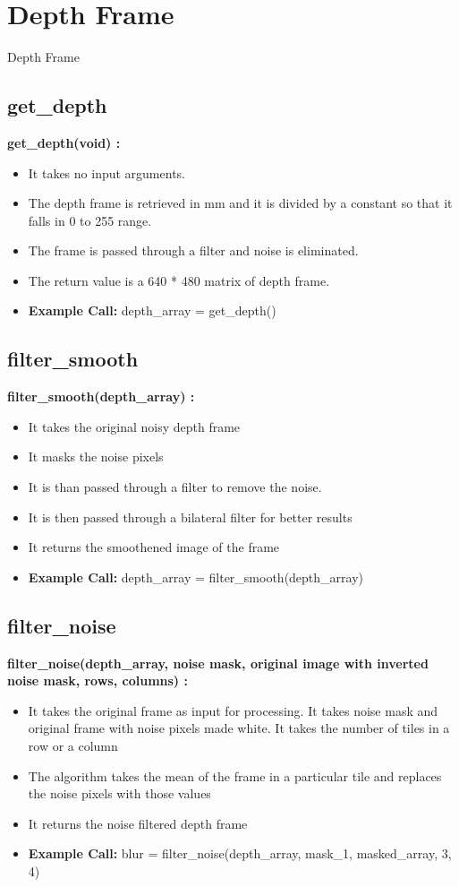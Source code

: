 \documentclass[10pt, a4paper]{beamer}
\begin{document}
\section{Depth Frame}
\begin{frame}[allowframebreaks]{Depth Frame}
  \subsection{get\_depth}
    \textbf{get\_depth(void) : }
    \begin{itemize}
     \item It takes no input arguments.
     \item The depth frame is retrieved in mm and it is divided by a constant so that it falls in 0 to 255 range.
     \item The frame is passed through a filter and noise is eliminated.
     \item The return value is a 640 * 480 matrix of depth frame.
     \item \textbf{Example Call:} depth\_array = get\_depth()
    \end{itemize}
  \framebreak
  \subsection{filter\_smooth}
    \textbf{filter\_smooth(depth\_array) : }
    \begin{itemize}
     \item It takes the original noisy depth frame
     \item It masks the noise pixels
     \item It is than passed through a filter to remove the noise. 
     \item It is then passed through a bilateral filter for better results
     \item It returns the smoothened image of the frame
     \item \textbf{Example Call:} depth\_array = filter\_smooth(depth\_array)
    \end{itemize}
  \framebreak
  \subsection{filter\_noise}
    \textbf{filter\_noise(depth\_array, noise mask, original image with inverted noise mask, rows, columns) : }
     \begin{itemize}
      \item It takes the original frame as input for processing. It takes noise mask and original frame with noise pixels made white. It takes the number of tiles in a row or a column
      \item The algorithm takes the mean of the frame in a particular tile and replaces the noise pixels with those values
      \item It returns the noise filtered depth frame
      \item \textbf{Example Call:} blur = filter\_noise(depth\_array, mask\_1, masked\_array, 3, 4)
     \end{itemize}
\end{frame}
\end{document}
